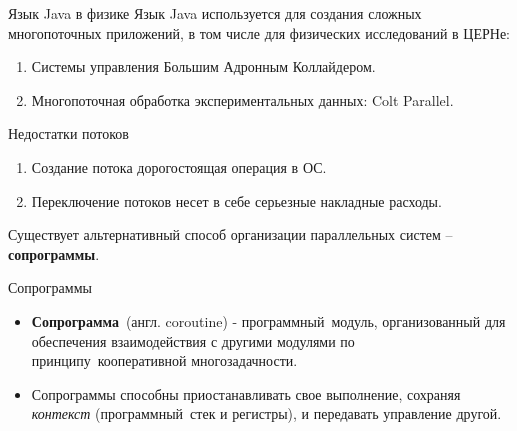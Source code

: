 
{
\begin{frame}[noframenumbering]
		\titlepage
\end{frame}
}

\begin{frame}{Язык Java в физике}
	Язык Java используется для создания сложных многопоточных приложений, в том
	числе для физических исследований в ЦЕРНе: 
	\begin{enumerate}
		\item Системы управления Большим Адронным Коллайдером.
		\item Многопоточная обработка экспериментальных данных: Colt Parallel. 
	\end{enumerate}
\end{frame}

\begin{frame}{Недостатки потоков}
	\begin{enumerate}
		\item Создание потока дорогостоящая операция в ОС.
		\item Переключение потоков несет в себе серьезные накладные расходы.
	\end{enumerate}
	Существует альтернативный способ организации параллельных систем -- \textbf{сопрограммы}. 
\end{frame}

\begin{frame}{Сопрограммы}
	\begin{itemize}
		\item \textbf{Сопрограмма} (англ. coroutine) - программный модуль, организованный для обеспечения взаимодействия с другими модулями по принципу кооперативной многозадачности.
		
		\item Сопрограммы способны приостанавливать свое выполнение, сохраняя \textit{контекст} 
		(программный стек и регистры), и передавать управление другой.
	\end{itemize}
\end{frame}


